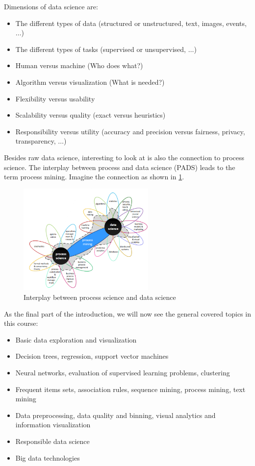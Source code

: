 Dimensions of data science are:
\begin{itemize}
  \item The different types of data (structured or unstructured, text, images, events, $\dots$)
  \item The different types of tasks (supervised or unsupervised, $\dots$)
  \item Human versus machine (Who does what?)
  \item Algorithm versus visualization (What is needed?)
  \item Flexibility versus usability
  \item Scalability versus quality (exact versus heuristics)
  \item Responsibility versus utility (accuracy and precision versus fairness, privacy, transparency, $\dots$)
\end{itemize}

Besides raw data science, interesting to look at is also the connection to process science. The interplay between process and data science (PADS) leads to the term process mining. Imagine the connection as shown in \ref{fig:0_pads}.

\begin{figure}[H]
  \centering
  \includegraphics[width=0.6\textwidth]{assets/intro/pads.png} 
  \caption{Interplay between process science and data science}
  \label{fig:0_pads}
\end{figure}

As the final part of the introduction, we will now see the general covered topics in this course:
\begin{itemize}
  \item Basic data exploration and visualization
  \item Decision trees, regression, support vector machines
  \item Neural networks, evaluation of supervised learning problems, clustering
  \item Frequent items sets, association rules, sequence mining, process mining, text mining
  \item Data preprocessing, data quality and binning, visual analytics and information visualization
  \item Responsible data science
  \item Big data technologies
\end{itemize}

